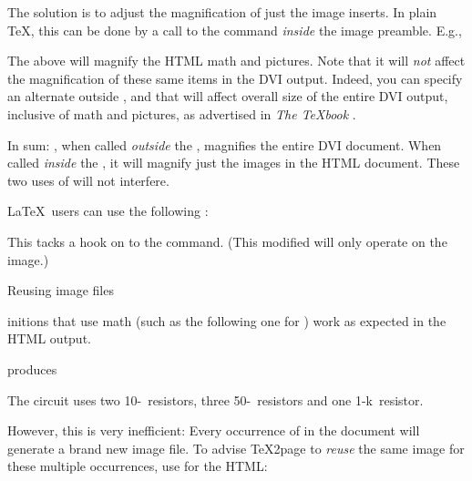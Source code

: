 {{{{{{{{{{{{{{The solution is to adjust the magnification of  just
the image inserts.  In plain \TeX, this can be
done by a call to the \p{\magnification} command {\em
inside} the image preamble.  E.g.,


\n The above will magnify the HTML math and pictures.
Note that it will {\em not} affect the magnification
of these same items in the DVI output.  Indeed,
you can specify an alternate \p{\magnification}
outside \p{\imgpreamble}, and that will affect
overall size of the entire DVI output, inclusive of
math and pictures, as advertised in {\em The \TeX book}
\cite{tex}.

In sum: \p{\magnification}, when called {\em
outside} the \p{\imgpreamble}, magnifies the
entire DVI document.  When called {\em inside}
the \p{\imgpreamble}, it will magnify  just the
images in the HTML document.  These two uses
of \p{\magnification} will not interfere.

\LaTeX\ users can use the following%
\iffalse, but there
must be a better way\fi:

\p{
\ifx\shipout\UnDeFiNeD
  \imgpreamble
    \let\LaTeXdocument\document
    \def\document{\LaTeXdocument\Large}
  \endimgpreamble
\fi
}

This tacks a hook on to the \p{\document} command.
(This modified \p{\document} will only operate
on the image.)

\beginsection Reusing image files

%
\p{\def}initions that use math (such as the following
one for \p{\ohm}) work as expected in the
HTML output.


\n produces

\quote

\n The circuit uses two 10-\ohm\ resistors, three 50-\ohm\
resistors and one 1-k\ohm\ resistor.

\endquote


\n However, this is very inefficient: Every occurrence
of \p{\ohm} in the document will generate a brand new
image file.  To advise \TeX2page to {\em reuse}
the same image for these multiple occurrences, use
\p{\imgdef} for the HTML:

}}}}}}}}}}}}}}
